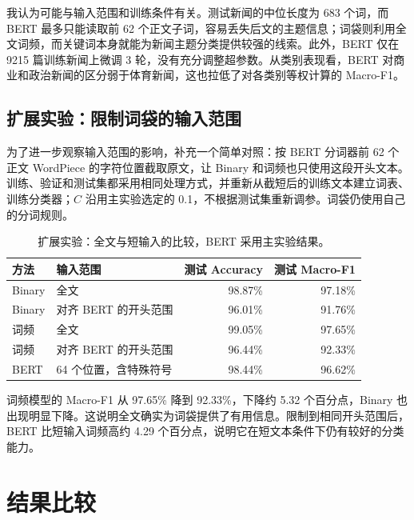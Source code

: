 \documentclass[12pt, a4paper, fontset=fandol]{ctexart}
\begin{document}
我认为可能与输入范围和训练条件有关。测试新闻的中位长度为 683 个词，而 BERT 最多只能读取前 62 个正文子词，容易丢失后文的主题信息；词袋则利用全文词频，而关键词本身就能为新闻主题分类提供较强的线索。此外，BERT 仅在 9215 篇训练新闻上微调 3 轮，没有充分调整超参数。从类别表现看，BERT 对商业和政治新闻的区分弱于体育新闻，这也拉低了对各类别等权计算的 Macro-F1。

\subsection{扩展实验：限制词袋的输入范围}
为了进一步观察输入范围的影响，补充一个简单对照：按 BERT 分词器前 62 个正文 WordPiece 的字符位置截取原文，让 Binary 和词频也只使用这段开头文本。训练、验证和测试集都采用相同处理方式，并重新从截短后的训练文本建立词表、训练分类器；$C$ 沿用主实验选定的 0.1，不根据测试集重新调参。词袋仍使用自己的分词规则。

\begin{table}[H]\centering
\begin{tabular}{llrr}\hline\hline
方法 & 输入范围 & 测试 Accuracy & 测试 Macro-F1\\\hline
Binary & 全文 & 98.87\% & 97.18\%\\
Binary & 对齐 BERT 的开头范围 & 96.01\% & 91.76\%\\
词频 & 全文 & 99.05\% & 97.65\%\\
词频 & 对齐 BERT 的开头范围 & 96.44\% & 92.33\%\\
BERT & 64 个位置，含特殊符号 & 98.44\% & 96.62\%\\\hline\hline
\end{tabular}
\caption{扩展实验：全文与短输入的比较，BERT 采用主实验结果。}
\end{table}
词频模型的 Macro-F1 从 97.65\% 降到 92.33\%，下降约 5.32 个百分点，Binary 也出现明显下降。这说明全文确实为词袋提供了有用信息。限制到相同开头范围后，BERT 比短输入词频高约 4.29 个百分点，说明它在短文本条件下仍有较好的分类能力。

\section{结果比较}
\end{document}

